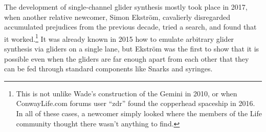 The development of single-channel glider synthesis mostly took place in 2017, when another relative newcomer, Simon Ekstr{\"o}m, cavalierly disregarded accumulated prejudices from the previous decade, tried a search, and found that it worked.\footnote{This is not unlike Wade's construction of the Gemini in 2010, or when ConwayLife.com forums user ``zdr'' found the copperhead spaceship in 2016. In all of these cases, a newcomer simply looked where the members of the Life community thought there wasn't anything to find.} It was already known in 2015 how to emulate arbitrary glider synthesis via gliders on a single lane, but Ekstr{\"o}m was the first to show that it is possible even when the gliders are far enough apart from each other that they can be fed through standard components like Snarks and syringes.



